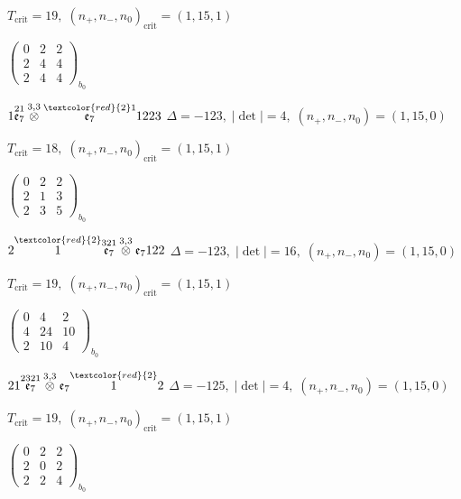 \documentclass[10pt]{article}
\begin{document}
\hspace{1em}$T_{\text{crit}}=19,\; (n_+,n_-,n_0)_{\text{crit}}=(1,15,1)$

\hspace{2em}$\left(\begin{smallmatrix}0 & 2 & 2 \\ 2 & 4 & 4 \\ 2 & 4 & 4\end{smallmatrix}\right)_{\!b_0}$

$1\overset{21}{\mathfrak{e}_7}\overset{3,3}{\otimes}\overset{\textcolor{red}{2}1}{\mathfrak{e}_7}1223$ \quad $\Delta=-123,\; |\det|=4,\; (n_+,n_-,n_0)=(1,15,0)$

\hspace{1em}$T_{\text{crit}}=18,\; (n_+,n_-,n_0)_{\text{crit}}=(1,15,1)$

\hspace{2em}$\left(\begin{smallmatrix}0 & 2 & 2 \\ 2 & 1 & 3 \\ 2 & 3 & 5\end{smallmatrix}\right)_{\!b_0}$

\smallskip

$2\overset{\textcolor{red}{2}}{1}\overset{321}{\mathfrak{e}_7}\overset{3,3}{\otimes}\mathfrak{e}_7122$ \quad $\Delta=-123,\; |\det|=16,\; (n_+,n_-,n_0)=(1,15,0)$

\hspace{1em}$T_{\text{crit}}=19,\; (n_+,n_-,n_0)_{\text{crit}}=(1,15,1)$

\hspace{2em}$\left(\begin{smallmatrix}0 & 4 & 2 \\ 4 & 24 & 10 \\ 2 & 10 & 4\end{smallmatrix}\right)_{\!b_0}$

\smallskip

$21\overset{2321}{\mathfrak{e}_7}\overset{3,3}{\otimes}\mathfrak{e}_7\overset{\textcolor{red}{2}}{1}2$ \quad $\Delta=-125,\; |\det|=4,\; (n_+,n_-,n_0)=(1,15,0)$

\hspace{1em}$T_{\text{crit}}=19,\; (n_+,n_-,n_0)_{\text{crit}}=(1,15,1)$

\hspace{2em}$\left(\begin{smallmatrix}0 & 2 & 2 \\ 2 & 0 & 2 \\ 2 & 2 & 4\end{smallmatrix}\right)_{\!b_0}$
\end{document}
